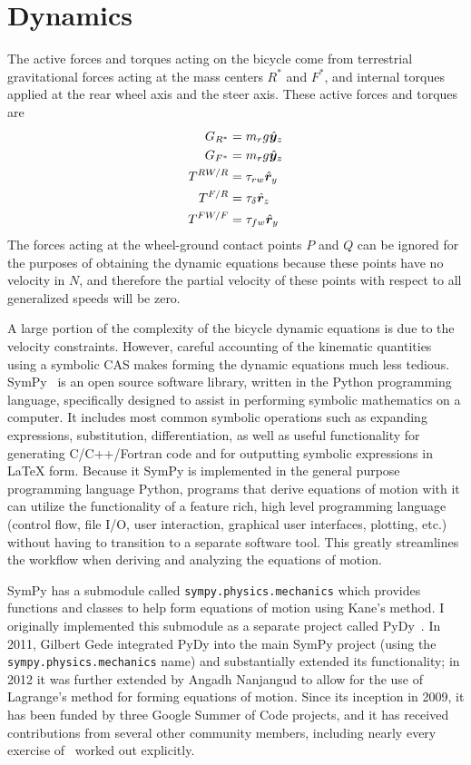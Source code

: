 \section{Dynamics} \label{model:dynamics}
The active forces and torques acting on the bicycle come from terrestrial gravitational
forces acting at the mass centers $R^*$ and $F^*$, and internal torques applied
at the rear wheel axis and the steer axis. These active forces and torques are
\begin{align}
  G_{R^*} &= m_r g \hat{\boldsymbol{y}}_{z} \\
  G_{F^*} &= m_r g \hat{\boldsymbol{y}}_{z} \\
  T^{RW/R}&= \tau_{rw} \hat{\boldsymbol{r}}_{y} \\
  T^{F/R}&= \tau_{\delta} \hat{\boldsymbol{r}}_{z} \\
  T^{FW/F}&= \tau_{fw} \hat{\boldsymbol{r}}_{y}
\end{align}
The forces acting at the wheel-ground contact points $P$ and $Q$ can be ignored
for the purposes of obtaining the dynamic equations because these points have
no velocity in $N$, and therefore the partial velocity of these points with
respect to all generalized speeds will be zero.

A large portion of the complexity of the bicycle dynamic equations is due to
the velocity constraints. However, careful accounting of the kinematic
quantities using a symbolic CAS makes forming the dynamic equations much less
tedious. SymPy~\cite{SymPy} is an open source software library, written in the
Python programming language, specifically designed to assist in performing
symbolic mathematics on a computer. It includes most common symbolic operations
such as expanding expressions, substitution, differentiation, as well as useful
functionality for generating C/C++/Fortran code and for outputting symbolic
expressions in \LaTeX{} form. Because it SymPy is implemented in the general
purpose programming language Python, programs that derive equations of motion
with it can utilize the functionality of a feature rich, high level programming
language (control flow, file I/O, user interaction, graphical user interfaces,
plotting, etc.) without having to transition to a separate software tool. This
greatly streamlines the workflow when deriving and analyzing the equations of
motion.

SymPy has a submodule called \verb|sympy.physics.mechanics| which provides
functions and classes to help form equations of motion using Kane's method. I
originally implemented this submodule as a separate project called
PyDy~\cite{PyDy}. In 2011, Gilbert Gede integrated PyDy into the main SymPy
project (using the \verb|sympy.physics.mechanics| name) and substantially
extended its functionality; in 2012 it was further extended by Angadh Nanjangud
to allow for the use of Lagrange's method for forming equations of motion.
Since its inception in 2009, it has been funded by three Google Summer of Code
projects, and it has received contributions from several other community
members, including nearly every exercise of~\cite{Kane1985} worked out
explicitly.

